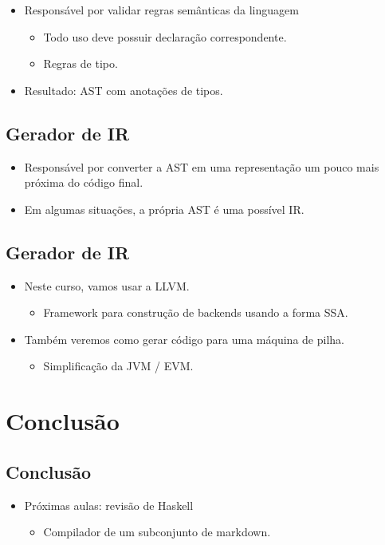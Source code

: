 \documentclass[11pt]{article}
\begin{document}
\begin{itemize}
\item Responsável por validar regras semânticas da linguagem
\begin{itemize}
\item Todo uso deve possuir declaração correspondente.
\item Regras de tipo.
\end{itemize}

\item Resultado: AST com anotações de tipos.
\end{itemize}
\subsection*{Gerador de IR}
\label{sec:orgcfa6002}

\begin{itemize}
\item Responsável por converter a AST em uma representação um pouco
mais próxima do código final.

\item Em algumas situações, a própria AST é uma possível IR.
\end{itemize}
\subsection*{Gerador de IR}
\label{sec:org0c27e3b}

\begin{itemize}
\item Neste curso, vamos usar a LLVM.
\begin{itemize}
\item Framework para construção de backends usando a forma SSA.
\end{itemize}

\item Também veremos como gerar código para uma máquina de pilha.
\begin{itemize}
\item Simplificação da JVM / EVM.
\end{itemize}
\end{itemize}
\section*{Conclusão}
\label{sec:org81e22ce}

\subsection*{Conclusão}
\label{sec:org73edea8}

\begin{itemize}
\item Próximas aulas: revisão de Haskell
\begin{itemize}
\item Compilador de um subconjunto de markdown.
\end{itemize}
\end{itemize}
\end{document}
